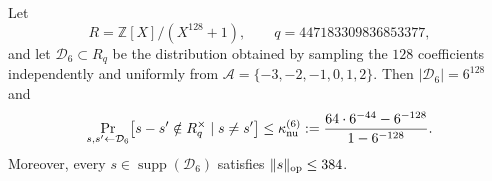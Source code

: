 \begin{lemma}
\label{lem:radix-six-approx-strong}
Let
\[
  R=\mathbb Z[X]/(X^{128}+1),\qquad
  q=447183309836853377,
\]
and let $\mathcal D_6\subset R_q$ be the distribution obtained by sampling
the $128$ coefficients independently and uniformly from
$\mathcal A=\{-3,-2,-1,0,1,2\}$.  Then
$|\mathcal D_6|=6^{128}$ and
\[
  \Pr_{s,s'\leftarrow\mathcal D_6}
  \bigl[s-s'\notin R_q^\times\mid s\ne s'\bigr]
  \le
  \kappa_{\rm nu}^{(6)}
  :=\frac{64\cdot6^{-44}-6^{-128}}{1-6^{-128}}.
\]
Moreover, every $s\in\operatorname{supp}(\mathcal D_6)$ satisfies
$\|s\|_{\rm op}\le384$.
\end{lemma}

